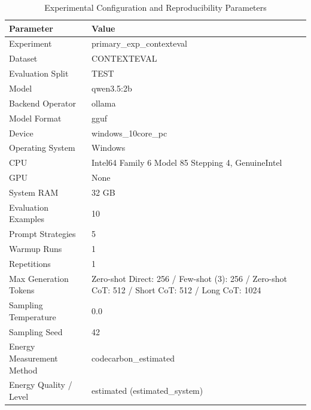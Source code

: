 \begin{table}
\caption{Experimental Configuration and Reproducibility Parameters}
\label{tab:experimental_configuration}
\begin{tabular}{ll}
\toprule
Parameter & Value \\
\midrule
Experiment & primary\_exp\_contexteval \\
Dataset & CONTEXTEVAL \\
Evaluation Split & TEST \\
Model & qwen3.5:2b \\
Backend Operator & ollama \\
Model Format & gguf \\
Device & windows\_10core\_pc \\
Operating System & Windows \\
CPU & Intel64 Family 6 Model 85 Stepping 4, GenuineIntel \\
GPU & None \\
System RAM & 32 GB \\
Evaluation Examples & 10 \\
Prompt Strategies & 5 \\
Warmup Runs & 1 \\
Repetitions & 1 \\
Max Generation Tokens & Zero-shot Direct: 256 / Few-shot (3): 256 / Zero-shot CoT: 512 / Short CoT: 512 / Long CoT: 1024 \\
Sampling Temperature & 0.0 \\
Sampling Seed & 42 \\
Energy Measurement Method & codecarbon\_estimated \\
Energy Quality / Level & estimated (estimated\_system) \\
\bottomrule
\end{tabular}
\end{table}
